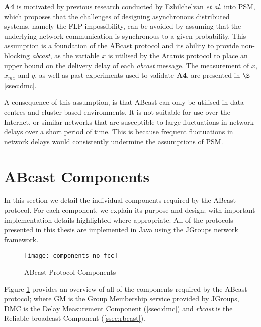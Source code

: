 \begin{description}
        \textbf{A4} is motivated by previous research conducted by Ezhilchelvan \emph{et al.} \citep{Ezhilchelvan:2010:LPR:1773912.1773927} into PSM, which proposes that the challenges of designing asynchronous distributed systems, namely the FLP impossibility, can be avoided by assuming that the underlying network communication is synchronous to a given probability.  This assumption is a foundation of the \textsf{ABcast} protocol and its ability to provide non-blocking \emph{abcast}, as the variable $x$ is utilised by the \textsf{Aramis} protocol to place an upper bound on the delivery delay of each \emph{abcast} message.  The measurement of $x$, $x_{mx}$ and $q$, as well as past experiments used to validate \textbf{A4}, are presented in $\S$ \ref{ssec:dmc}.   
        
        A consequence of this assumption, is that \textsf{ABcast} can only be utilised in data centres and cluster-based environments.  It is not suitable for use over the Internet, or similar networks that are susceptible to large fluctuations in network delays over a short period of time.  This is because frequent fluctuations in network delays would consistently undermine the assumptions of PSM.  
    \end{description}
    
\section{ABcast Components}
In this section we detail the individual components required by the \textsf{ABcast} protocol.  For each component, we explain its purpose and design; with important implementation details highlighted where appropriate.  All of the protocols presented in this thesis are implemented in Java using the JGroups \citep{JGroups} network framework.  

    \begin{figure}[!h] 
        \centering    
         \texttt{[image: components\_no\_fcc]}
         \caption[\textsf{ABcast} Protocol Components Overview]{\textsf{ABcast} Protocol Components}
         \label{fig:abcast_components}
    \end{figure}
    
   Figure \ref{fig:abcast_components} provides an overview of all of the components required by the \textsf{ABcast} protocol; where GM is the Group Membership service provided by JGroups, DMC is the Delay Measurement Component (\ref{ssec:dmc}) and \emph{rbcast} is the Reliable broadcast Component (\ref{ssec:rbcast}).  

